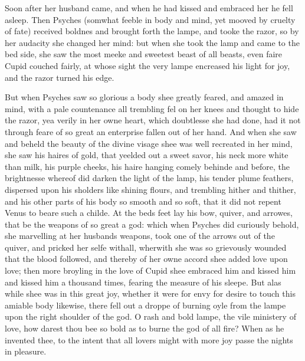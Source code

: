 Soon after her husband came, and when he had kissed and embraced her he fell
asleep. Then Psyches (somwhat feeble in body and mind, yet mooved by cruelty of
fate) received boldnes and brought forth the lampe, and tooke the razor, so by
her audacity she changed her mind: but when she took the lamp and came to the
bed side, she saw the most meeke and sweetest beast of all beasts, even faire
Cupid couched fairly, at whose sight the very lampe encreased his light for
joy, and the razor turned his edge.

But when Psyches saw so glorious a body shee greatly feared, and amazed in
mind, with a pale countenance all trembling fel on her knees and thought to
hide the razor, yea verily in her owne heart, which doubtlesse she had done,
had it not through feare of so great an enterprise fallen out of her hand. And
when she saw and beheld the beauty of the divine visage shee was well recreated
in her mind, she saw his haires of gold, that yeelded out a sweet savor, his
neck more white than milk, his purple cheeks, his haire hanging comely behinde
and before, the brightnesse whereof did darken the light of the lamp, his
tender plume feathers, dispersed upon his sholders like shining flours, and
trembling hither and thither, and his other parts of his body so smooth and so
soft, that it did not repent Venus to beare such a childe. At the beds feet lay
his bow, quiver, and arrowes, that be the weapons of so great a god: which when
Psyches did curiously behold, she marvelling at her husbands weapons, took one
of the arrows out of the quiver, and pricked her selfe withall, wherwith she
was so grievously wounded that the blood followed, and thereby of her owne
accord shee added love upon love; then more broyling in the love of Cupid shee
embraced him and kissed him and kissed him a thousand times, fearing the
measure of his sleepe. But alas while shee was in this great joy, whether it
were for envy for desire to touch this amiable body likewise, there fell out a
droppe of burning oyle from the lampe upon the right shoulder of the god. O
rash and bold lampe, the vile ministery of love, how darest thou bee so bold as
to burne the god of all fire? When as he invented thee, to the intent that all
lovers might with more joy passe the nights in pleasure.

